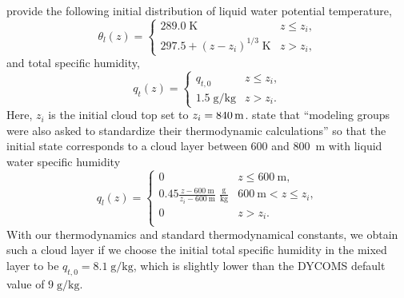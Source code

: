 \documentclass{article}
\begin{document}
\cite{Stevens05a} provide the following initial distribution of liquid water potential temperature,
\begin{equation}\label{eq:dycoms1}
\theta_l(z) = 
    \begin{cases}
    289.0\;\mathrm{K} & z\leq z_i,\\
    297.5 + (z - z_i)^{1/3}\;\mathrm{K}& z > z_i,
    \end{cases}
\end{equation}
and total specific humidity, 
\begin{equation}\label{eq:dycoms2}
q_t(z) = 
    \begin{cases}
    q_{t,0} & z\leq z_i,\\
    1.5\;\mathrm{g/kg} & z > z_i.
    \end{cases}
\end{equation}
Here, $z_i$ is the initial cloud top set to $z_i=840\,{\rm m}$. \cite{Stevens05a} state that ``modeling groups were also asked to standardize their thermodynamic calculations'' so that the initial state corresponds to a cloud layer between 600 and 800~m with liquid water specific humidity
\begin{equation}\label{eq:dycoms2}
q_l(z) = 
    \begin{cases}
    0 & z\leq 600~\mathrm{m},\\
    0.45\frac{{}z - 600~\mathrm{m}}{z_i - 600~\mathrm{m}}\;\mathrm{\frac{g}{kg}}   & 600~\mathrm{m} < z \leq z_i,\\
    0 & z > z_i.\\
    \end{cases}
\end{equation}
With our thermodynamics and standard thermodynamical constants, we obtain such a cloud layer if we choose the initial total specific humidity in the mixed layer to be $q_{t,0} = 8.1\;\mathrm{g/kg}$, which is slightly lower than the DYCOMS default value of $9\;\mathrm{g/kg}$.
\end{document}
